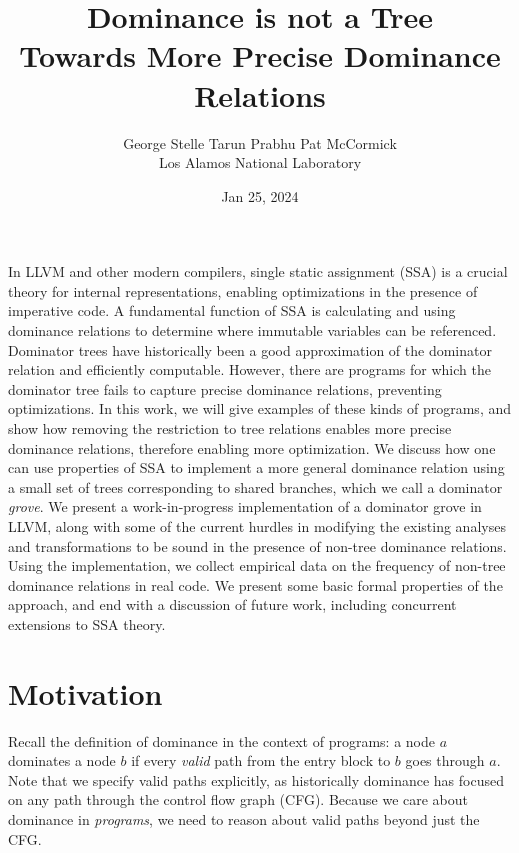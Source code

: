 \documentclass[a4paper,twocolumn]{article}
\title{Dominance is not a Tree \\
\Large{Towards More Precise Dominance Relations}}
\date{Jan 25, 2024}
\author{George Stelle \; Tarun Prabhu \; Pat McCormick \\ Los Alamos National Laboratory}
\begin{document}
\maketitle

In LLVM and other modern compilers, single static assignment (SSA) is a crucial
theory for internal representations, enabling optimizations in the presence of
imperative code. A fundamental function of SSA is calculating and using
dominance relations to determine where immutable variables can be referenced.
Dominator trees have historically been a good approximation of the dominator
relation and efficiently computable. However, there are programs for which the
dominator tree fails to capture precise dominance relations, preventing
optimizations. In this work, we will give examples of these kinds of programs,
and show how removing the restriction to tree relations enables more precise
dominance relations, therefore enabling more optimization. We discuss how one
can use properties of SSA to implement a more general dominance relation using
a small set of trees corresponding to shared branches, which we call a
dominator \emph{grove}. We present a work-in-progress implementation of a
dominator grove in LLVM, along with some of the current hurdles in modifying
the existing analyses and transformations to be sound in the presence of
non-tree dominance relations. Using the implementation, we collect empirical
data on the frequency of non-tree dominance relations in real code. We present
some basic formal properties of the approach, and end with a discussion of
future work, including concurrent extensions to SSA theory.  

\section*{Motivation}
Recall the definition of dominance in the context of programs: a node $a$
dominates a node $b$ if every \emph{valid} path from the entry block to $b$ goes
through $a$. Note that we specify valid paths explicitly, as historically
dominance has focused on any path through the control flow graph (CFG).
Because we care about dominance in \emph{programs}, we need to reason about
valid paths beyond just the CFG. 
\end{document}
